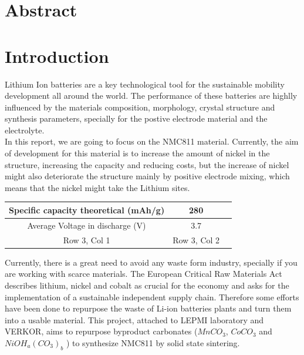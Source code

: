 \documentclass{article}
\begin{document}
\date{
  \vspace{2cm}
  \small{January 24, 2024}
}




\maketitle
\newpage
\setcounter{page}{1}  %
\tableofcontents
\newpage
\section{Abstract}
\section {Introduction}

Lithium Ion batteries are a key technological tool for the sustainable mobility
 development all around the world. The performance of these batteries are highlly 
 influenced by the materials composition, morphology, crystal structure and synthesis 
 parameters, specially for the postive electrode material and the electrolyte.\\

In this report, we are going to focus on the NMC811 material. Currently, the aim of development
for this material is to increase the amount of nickel in the structure, increasing the
capacity and reducing costs, but the increase of nickel might also deteriorate the structure
mainly by positive electrode mixing, which means that the nickel might take the Lithium sites.\cite{topo}\\
\begin{center}
  

\begin{tabular}{|c|c|c|}
  
  \hline
  Specific capacity
theoretical
(mAh/g) & 280  \\
  \hline
  Average Voltage in discharge (V) & 3.7  \\
  \hline
  Row 3, Col 1 & Row 3, Col 2 \\
  \hline
\end{tabular}
\end{center}

Currently, there is a great need to avoid any waste form industry,
specially if you are working with scarce materials. The European Critical Raw Materials Act describes lithium, nickel and cobalt as crucial for the economy and asks for the implementation of a sustainable independent supply chain.\cite{RMA} Therefore some efforts
have been done to repurpose the waste of Li-ion batteries plants and turn them into a usable material. This project, attached to LEPMI laboratory and VERKOR, aims to repurpose byproduct carbonates (\({MnCO}_{3}\), \({CoCO}_{3}\) and \({NiOH}_{a}{({CO}_{3})}_{b}\) ) to synthesize NMC811 by solid state sintering. \\
\end{document}
